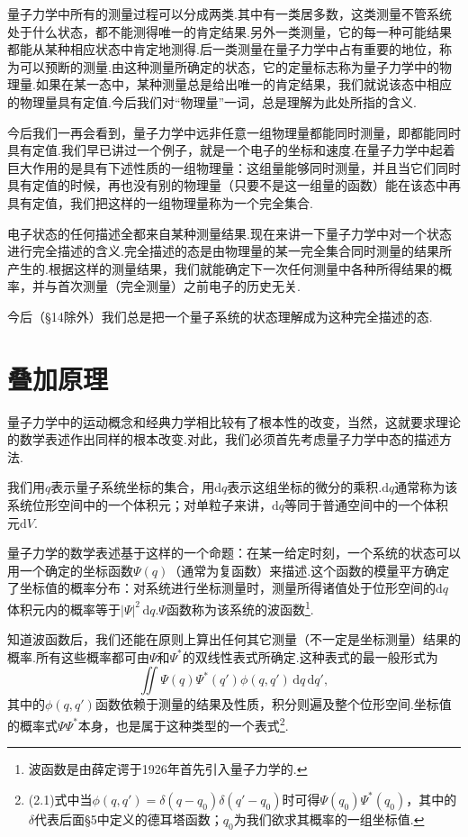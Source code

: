 量子力学中所有的测量过程可以分成两类.其中有一类居多数，这类测量不管系统处于什么状态，都不能测得唯一的肯定结果.另外一类测量，它的每一种可能结果都能从某种相应状态中肯定地测得.后一类测量在量子力学中占有重要的地位，称为可以预断的测量.由这种测量所确定的状态，它的定量标志称为量子力学中的物理量.如果在某一态中，某种测量总是给出唯一的肯定结果，我们就说该态中相应的物理量具有定值.今后我们对“物理量”一词，总是理解为此处所指的含义.

今后我们一再会看到，量子力学中远非任意一组物理量都能同时测量，即都能同时具有定值.我们早已讲过一个例子，就是一个电子的坐标和速度.在量子力学中起着巨大作用的是具有下述性质的一组物理量：这组量能够同时测量，并且当它们同时具有定值的时候，再也没有别的物理量（只要不是这一组量的函数）能在该态中再具有定值，我们把这样的一组物理量称为一个完全集合.

电子状态的任何描述全都来自某种测量结果.现在来讲一下量子力学中对一个状态进行完全描述的含义.完全描述的态是由物理量的某一完全集合同时测量的结果所产生的.根据这样的测量结果，我们就能确定下一次任何测量中各种所得结果的概率，并与首次测量（完全测量）之前电子的历史无关.

今后（§14除外）我们总是把一个量子系统的状态理解成为这种完全描述的态.

\section{叠加原理}

量子力学中的运动概念和经典力学相比较有了根本性的改变，当然，这就要求理论的数学表述作出同样的根本改变.对此，我们必须首先考虑量子力学中态的描述方法.

我们用$q$表示量子系统坐标的集合，用$\mathrm{d}q$表示这组坐标的微分的乘积.$\mathrm{d}q$通常称为该系统位形空间中的一个体积元；对单粒子来讲，$\mathrm{d}q$等同于普通空间中的一个体积元$\mathrm{d}V$.

量子力学的数学表述基于这样的一个命题：在某一给定时刻，一个系统的状态可以用一个确定的坐标函数$\varPsi(q)$（通常为复函数）来描述.这个函数的模量平方确定了坐标值的概率分布：对系统进行坐标测量时，测量所得诸值处于位形空间的$\mathrm{d}q$体积元内的概率等于$|\varPsi|^2\,\mathrm{d}q$.$\varPsi$函数称为该系统的波函数\footnote{波函数是由薛定谔于1926年首先引入量子力学的.}.

知道波函数后，我们还能在原则上算出任何其它测量（不一定是坐标测量）结果的概率.所有这些概率都可由$\varPsi$和$\varPsi^{*}$的双线性表式所确定.这种表式的最一般形式为
\begin{equation}
  \iint \varPsi(q)\varPsi^{*}(q')\phi(q,q')\,\mathrm{d}q\,\mathrm{d}q',
\end{equation}
其中的$\phi(q,q')$函数依赖于测量的结果及性质，积分则遍及整个位形空间.坐标值的概率式$\varPsi\varPsi^{*}$本身，也是属于这种类型的一个表式\footnote{(2.1)式中当$\phi(q,q')=\delta(q-q_0)\delta(q'-q_0)$时可得$\varPsi(q_0)\varPsi^{*}(q_0)$，其中的$\delta$代表后面§5中定义的德耳塔函数；$q_0$为我们欲求其概率的一组坐标值.}.

